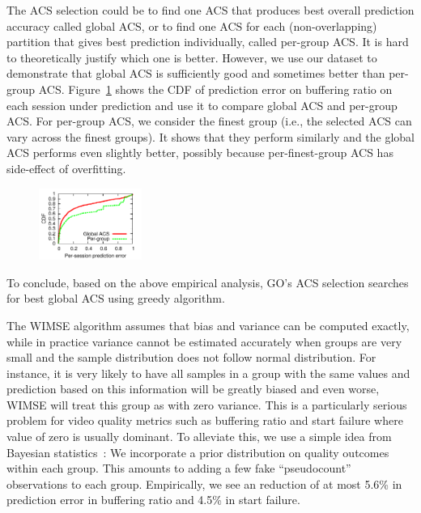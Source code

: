  The ACS selection could be to find one ACS that produces best overall prediction accuracy called global ACS, or to find one ACS for each (non-overlapping) partition that gives best prediction individually, called per-group ACS. 
It is hard to theoretically justify which one is better. However, we use our dataset to demonstrate that global ACS is sufficiently good and sometimes better than per-group ACS.
Figure~\ref{fig:global-acs} shows the CDF of prediction error on buffering ratio on each session under prediction and use it to compare global ACS and per-group ACS. For per-group ACS, we consider the finest group (i.e., the selected ACS can vary across the finest groups). It shows that they perform similarly and the global ACS performs even slightly better, possibly because per-finest-group ACS has side-effect of overfitting.

\begin{figure}[h!]
\centering
 \includegraphics[width=0.3\textwidth] {figures/newfig/example-granular-metric0-new.pdf}
\label{fig:global-acs}
\end{figure}

To conclude, based on the above empirical analysis, GO's ACS selection searches for best global ACS using greedy algorithm. 

\label{subsec:sudo}
The WIMSE algorithm assumes that bias and variance can be computed exactly, while in practice variance cannot be estimated accurately when groups are very small and the sample distribution does not follow normal distribution. For instance, it is very likely to have all samples in a group with the same values and prediction based on this information will be greatly biased and even worse, WIMSE will treat this group as with zero variance. This is a particularly serious problem for video quality metrics such as buffering ratio and start failure where value of zero is usually dominant.
To alleviate this, we use a simple idea from Bayesian statistics~\cite{}: We incorporate a prior distribution on quality outcomes within each group.  This amounts to adding a few fake ``pseudocount'' observations to each group.  Empirically, we see an reduction of at most 5.6\% in prediction error in buffering ratio and 4.5\% in start failure.

